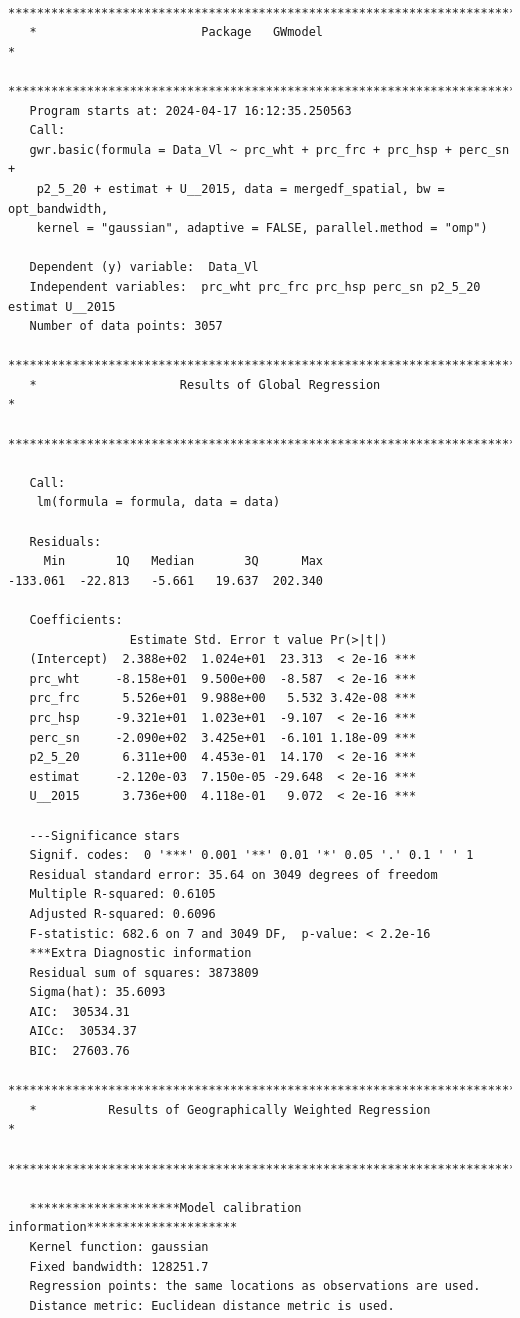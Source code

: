 \documentclass[
]{article}
\begin{document}
\begin{verbatim}
   ***********************************************************************
   *                       Package   GWmodel                             *
   ***********************************************************************
   Program starts at: 2024-04-17 16:12:35.250563 
   Call:
   gwr.basic(formula = Data_Vl ~ prc_wht + prc_frc + prc_hsp + perc_sn + 
    p2_5_20 + estimat + U__2015, data = mergedf_spatial, bw = opt_bandwidth, 
    kernel = "gaussian", adaptive = FALSE, parallel.method = "omp")

   Dependent (y) variable:  Data_Vl
   Independent variables:  prc_wht prc_frc prc_hsp perc_sn p2_5_20 estimat U__2015
   Number of data points: 3057
   ***********************************************************************
   *                    Results of Global Regression                     *
   ***********************************************************************

   Call:
    lm(formula = formula, data = data)

   Residuals:
     Min       1Q   Median       3Q      Max 
-133.061  -22.813   -5.661   19.637  202.340 

   Coefficients:
                 Estimate Std. Error t value Pr(>|t|)    
   (Intercept)  2.388e+02  1.024e+01  23.313  < 2e-16 ***
   prc_wht     -8.158e+01  9.500e+00  -8.587  < 2e-16 ***
   prc_frc      5.526e+01  9.988e+00   5.532 3.42e-08 ***
   prc_hsp     -9.321e+01  1.023e+01  -9.107  < 2e-16 ***
   perc_sn     -2.090e+02  3.425e+01  -6.101 1.18e-09 ***
   p2_5_20      6.311e+00  4.453e-01  14.170  < 2e-16 ***
   estimat     -2.120e-03  7.150e-05 -29.648  < 2e-16 ***
   U__2015      3.736e+00  4.118e-01   9.072  < 2e-16 ***

   ---Significance stars
   Signif. codes:  0 '***' 0.001 '**' 0.01 '*' 0.05 '.' 0.1 ' ' 1 
   Residual standard error: 35.64 on 3049 degrees of freedom
   Multiple R-squared: 0.6105
   Adjusted R-squared: 0.6096 
   F-statistic: 682.6 on 7 and 3049 DF,  p-value: < 2.2e-16 
   ***Extra Diagnostic information
   Residual sum of squares: 3873809
   Sigma(hat): 35.6093
   AIC:  30534.31
   AICc:  30534.37
   BIC:  27603.76
   ***********************************************************************
   *          Results of Geographically Weighted Regression              *
   ***********************************************************************

   *********************Model calibration information*********************
   Kernel function: gaussian 
   Fixed bandwidth: 128251.7 
   Regression points: the same locations as observations are used.
   Distance metric: Euclidean distance metric is used.


\end{verbatim}
\end{document}
